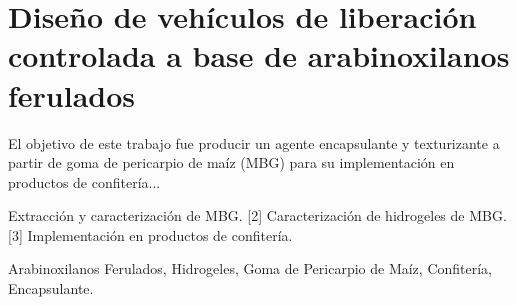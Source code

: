 \chapter*{Diseño de vehículos de liberación controlada a base de arabinoxilanos ferulados}

\begin{ResumenPhDThesis}

El objetivo de este trabajo fue producir un agente encapsulante y texturizante a partir de goma de pericarpio de maíz (MBG) para su implementación en productos de confitería...
	
	\begin{HighlightsPhDThesis}
		[1] Extracción y caracterización de MBG. 
		[2] Caracterización de hidrogeles de MBG. 
		[3] Implementación en productos de confitería.
	\end{HighlightsPhDThesis}

	\begin{PalabrasClavePhDThesis}
		Arabinoxilanos Ferulados, Hidrogeles, Goma de Pericarpio de Maíz, Confitería, Encapsulante.
	\end{PalabrasClavePhDThesis}

\end{ResumenPhDThesis}
